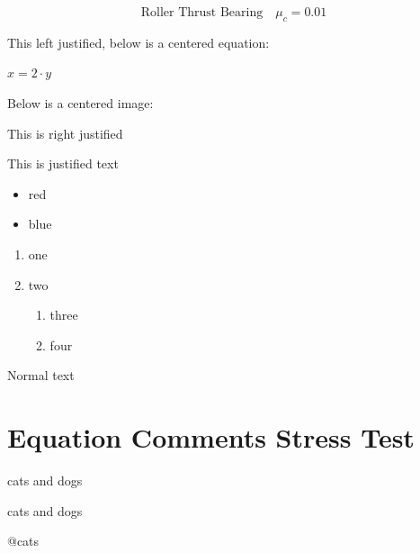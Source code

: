 \documentclass[
  a4paper,
]{article}
\providecommand{\tightlist}{%
  \setlength{\itemsep}{0pt}\setlength{\parskip}{0pt}}
\begin{document}
\[ \text{Roller Thrust Bearing} \quad \mu_{c} = 0.01 \]

This left justified, below is a centered equation:

\begin{center}

\(x=2\cdot y\)

\end{center}

Below is a centered image:

\begin{center}

\end{center}

\begin{flushright}

This is right justified

\end{flushright}

This is justified text

\begin{itemize}
\tightlist
\item
  red
\item
  blue
\end{itemize}

\begin{enumerate}
\def\labelenumi{\arabic{enumi}.}
\tightlist
\item
  one
\item
  two

  \begin{enumerate}
  \def\labelenumii{\alph{enumii}.}
  \tightlist
  \item
    three
  \item
    four
  \end{enumerate}
\end{enumerate}

Normal text

\section{Equation Comments Stress
Test}\label{equation-comments-stress-test}

cats and dogs

cats and dogs

@cats
\end{document}
